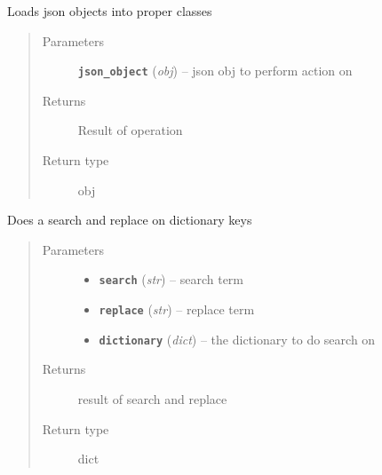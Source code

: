 \documentclass[letterpaper,10pt,english]{sphinxmanual}
\begin{document}
\begin{fulllineitems}
\label{zBuilder:zBuilder.nodeCollection.load_base_node}
Loads json objects into proper classes
\begin{quote}\begin{description}
\item[{Parameters}] \leavevmode
\textbf{\texttt{json\_object}} (\emph{obj}) -- json obj to perform action on

\item[{Returns}] \leavevmode
Result of operation

\item[{Return type}] \leavevmode
obj

\end{description}\end{quote}

\end{fulllineitems}


\begin{fulllineitems}
\label{zBuilder:zBuilder.nodeCollection.replace_dict_keys}
Does a search and replace on dictionary keys
\begin{quote}\begin{description}
\item[{Parameters}] \leavevmode\begin{itemize}
\item {} 
\textbf{\texttt{search}} (\emph{str}) -- search term

\item {} 
\textbf{\texttt{replace}} (\emph{str}) -- replace term

\item {} 
\textbf{\texttt{dictionary}} (\emph{dict}) -- the dictionary to do search on

\end{itemize}

\item[{Returns}] \leavevmode
result of search and replace

\item[{Return type}] \leavevmode
dict

\end{description}\end{quote}

\end{fulllineitems}
\end{document}
